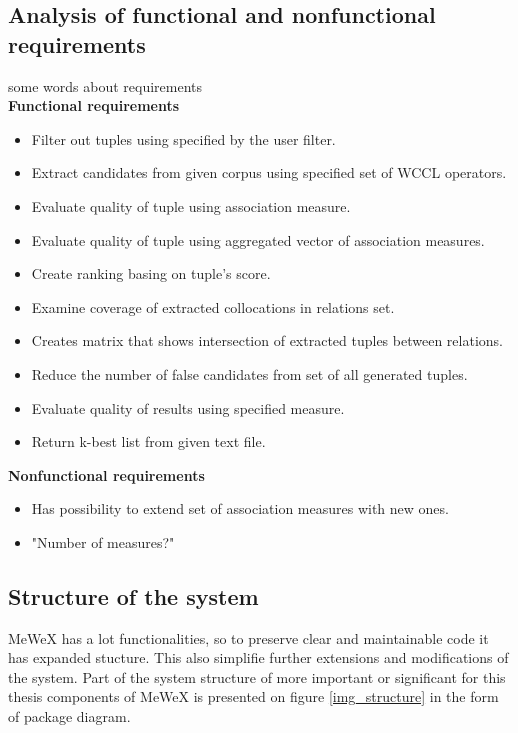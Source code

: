\subsection{Analysis of functional and nonfunctional requirements}
some words about requirements
\\\textbf{Functional requirements}
\begin{itemize}
    \setlength\itemsep{0em}
    \item Filter out tuples using specified by the user filter.
    \item Extract candidates from given corpus using specified set of WCCL operators.
    \item Evaluate quality of tuple using association measure.
    \item Evaluate quality of tuple using aggregated vector of association measures.
    \item Create ranking basing on tuple's score.
    \item Examine coverage of extracted collocations in relations set.
    \item Creates matrix that shows intersection of extracted tuples between relations.
    \item Reduce the number of false candidates from set of all generated tuples.
    \item Evaluate quality of results using specified measure.
    \item Return k-best list from given text file.
\end{itemize}
\textbf{Nonfunctional requirements}
\begin{itemize}
    \setlength\itemsep{0em}
    \item Has possibility to extend set of association measures with new ones.
    \item "Number of measures?"
\end{itemize}

\subsection{Structure of the system}
MeWeX has a lot functionalities, so to preserve clear and maintainable code it has expanded stucture. 
This also simplifie further extensions and modifications of the system. Part of the system structure of more important 
or significant for this thesis components of MeWeX is presented on figure \ref{img_structure} in the form of package diagram.

